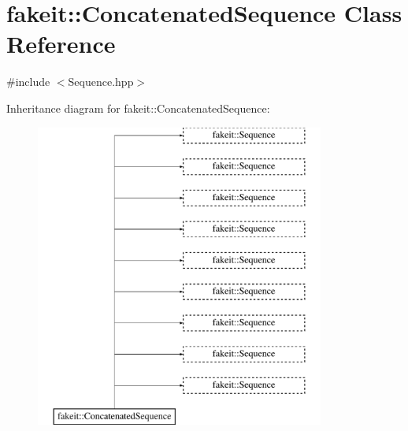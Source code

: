 \hypertarget{classfakeit_1_1ConcatenatedSequence}{}\section{fakeit\+::Concatenated\+Sequence Class Reference}
\label{classfakeit_1_1ConcatenatedSequence}


{\ttfamily \#include $<$Sequence.\+hpp$>$}

Inheritance diagram for fakeit\+::Concatenated\+Sequence\+:\begin{figure}[H]
\begin{center}
\leavevmode
\includegraphics[height=10.000000cm]{classfakeit_1_1ConcatenatedSequence}
\end{center}
\end{figure}
